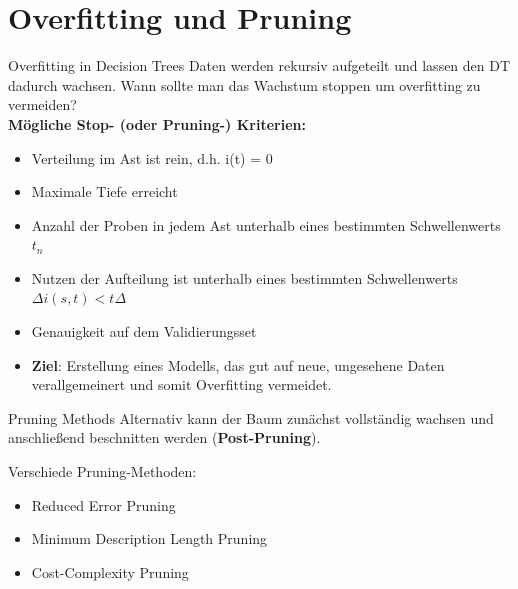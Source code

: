 \documentclass{beamer}
\begin{document}

\section{Overfitting und Pruning}

\begin{frame}{Overfitting in Decision Trees}
Daten werden rekursiv aufgeteilt und lassen den DT dadurch wachsen. Wann sollte man das Wachstum stoppen um overfitting zu vermeiden?\\
\textbf{Mögliche Stop- (oder Pruning-) Kriterien:}
\begin{itemize}
\item Verteilung im Ast ist rein, d.h. i(t) = 0
\item Maximale Tiefe erreicht
\item Anzahl der Proben in jedem Ast unterhalb eines bestimmten Schwellenwerts $t_n$
\item Nutzen der Aufteilung ist unterhalb eines bestimmten Schwellenwerts $\Delta i(s,t) < t\Delta$
\item Genauigkeit auf dem Validierungsset
\item {\textbf{Ziel}: Erstellung eines Modells, das gut auf neue, ungesehene Daten verallgemeinert und somit Overfitting vermeidet.}
\end{itemize}
\end{frame}

\begin{frame}{Pruning Methods}
Alternativ kann der Baum zunächst vollständig wachsen und anschließend beschnitten werden (\textbf{Post-Pruning}).
 \begin{alertblock}{Verschiede Pruning-Methoden:}
\begin{itemize}
\item Reduced Error Pruning
\item Minimum Description Length Pruning
\item Cost-Complexity Pruning

\end{itemize}

\end{alertblock}
\end{frame}
\end{document}

